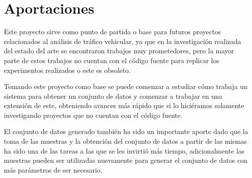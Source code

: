 \section{Aportaciones}

Este proyecto sirve como punto de partida o base para futuros proyectos relacionados al análisis de tráfico vehicular, ya que en la investigación realizada del estado del arte se encontraron trabajos muy prometedores, pero la mayor parte de estos trabajos no cuentan con el código fuente para replicar los experimentos realizados o este es obsoleto.

Tomando este proyecto como base se puede comenzar a estudiar cómo trabaja un sistema para obtener un conjunto de datos y comenzar a trabajar en una extensión de este, obteniendo avances más rápido que si lo hiciéramos solamente investigando proyectos que no cuentan con el código fuente.

El conjunto de datos generado también ha sido un importante aporte dado que la toma de las muestras y la obtención del conjunto de datos a partir de las mismas ha sido una de las tareas a las que se les invirtió más tiempo, adicionalmente las muestras pueden ser utilizadas nuevamente para generar el conjunto de datos con más parámetros de ser necesario.
